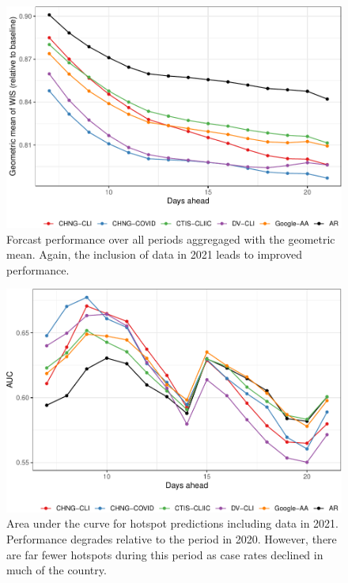 \documentclass[9pt,twoside,lineno]{pnas-new}
\begin{document}
\clearpage

\begin{figure}

{\centering \includegraphics[width=\textwidth]{fig/fcast-alldates-adjusted-1} 

}

\caption{Forcast performance over all periods aggregaged with the geometric mean. Again, the inclusion of data in 2021 leads to improved performance.}\label{fig:fcast-alldates-adjusted}
\end{figure}

\clearpage

\begin{figure}

{\centering \includegraphics[width=\textwidth]{fig/hot-alldates-1} 

}

\caption{Area under the curve for hotspot predictions including data in 2021. Performance degrades relative to the period in 2020. However, there are far fewer hotspots during this period as case rates declined in much of the country.}\label{fig:hot-alldates}
\end{figure}
\end{document}
